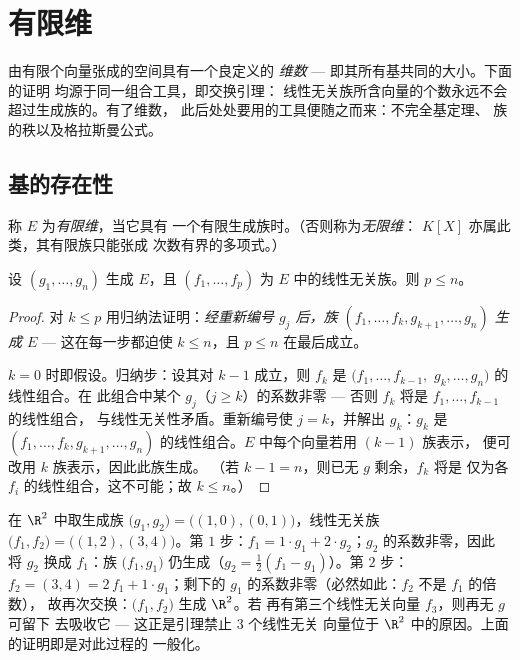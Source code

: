 \chapter{有限维}\label{ch:b1:findim}

由有限个向量张成的空间具有一个良定义的
\emph{维数} --- 即其所有基共同的大小。下面的证明
均源于同一组合工具，即交换引理：
线性无关族所含向量的个数永远不会超过生成族的。有了维数，
此后处处要用的工具便随之而来：不完全基定理、
族的秩以及格拉斯曼公式。

\section{基的存在性}

\begin{definition}\label{def:b1:findim:def}
称 $E$ 为\emph{有限维}，当它具有
一个有限生成族时。（否则称为\emph{无限维}：
$K[X]$ 亦属此类，其有限族只能张成
次数有界的多项式。）
\end{definition}

\begin{theorem}[交换引理]\label{thm:b1:findim:exchange}
设 $(g_1, \dots, g_n)$ 生成 $E$，且 $(f_1, \dots, f_p)$ 为
$E$ 中的线性无关族。则 $p \leq n$。
\end{theorem}

\begin{proof}
对 $k \leq p$ 用归纳法证明：\emph{经重新编号
$g_j$ 后，族 $(f_1, \dots, f_k, g_{k+1}, \dots, g_n)$ 生成
$E$} --- 这在每一步都迫使 $k \leq n$，且 $p \leq n$
在最后成立。

$k = 0$ 时即假设。归纳步：设其对 $k - 1$ 成立，则 $f_k$ 是
$(f_1, \dots, f_{k-1},$ $g_k, \dots, g_n)$ 的线性组合。在
此组合中某个 $g_j$（$j \geq k$）的系数非零
---
否则 $f_k$ 将是 $f_1, \dots, f_{k-1}$ 的线性组合，
与线性无关性矛盾。重新编号使 $j = k$，并解出
$g_k$：$g_k$ 是 $(f_1, \dots, f_k, g_{k+1}, \dots,
g_n)$ 的线性组合。$E$ 中每个向量若用 $(k-1)$ 族表示，
便可改用 $k$ 族表示，因此此族生成。
（若 $k - 1 = n$，则已无 $g$ 剩余，$f_k$ 将是
仅为各 $f_i$ 的线性组合，这不可能；故 $k \leq n$。）
\end{proof}

\begin{example}[交换过程的一次演示]
\label{ex:b1:findim:exchangerun}
在 $\R^2$ 中取生成族 $\bigl(g_1, g_2\bigr) =
\bigl((1,0), (0,1)\bigr)$，线性无关族 $\bigl(f_1,
f_2\bigr) = \bigl((1,2), (3,4)\bigr)$。第 $1$ 步：$f_1 = 1\cdot
g_1 + 2\cdot g_2$；$g_2$ 的系数非零，因此
将 $g_2$ 换成 $f_1$：族 $\bigl(f_1, g_1\bigr)$
仍生成（$g_2 = \frac12(f_1 - g_1)$）。第 $2$ 步：$f_2 =
(3,4) = 2\,f_1 + 1\cdot g_1$；剩下的
$g_1$ 的系数非零（必然如此：$f_2$ 不是 $f_1$ 的倍数），
故再次交换：$\bigl(f_1, f_2\bigr)$ 生成 $\R^2$。若
再有第三个线性无关向量 $f_3$，则再无 $g$ 可留下
去吸收它 --- 这正是引理禁止 $3$ 个线性无关
向量位于 $\R^2$ 中的原因。上面的证明即是对此过程的
一般化。
\end{example}


